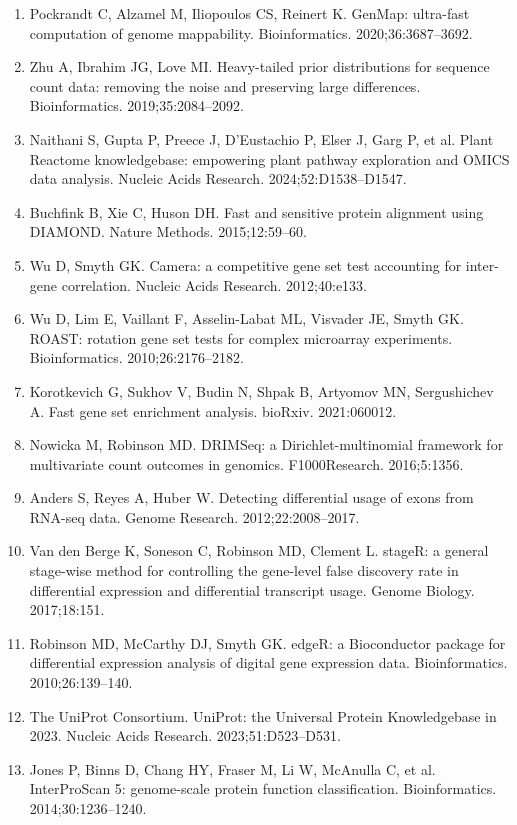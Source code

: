 \documentclass[11pt]{article}
\begin{document}
\begin{enumerate}[itemsep=1pt,leftmargin=1.6em]
\item Pockrandt C, Alzamel M, Iliopoulos CS, Reinert K. GenMap: ultra-fast computation of genome mappability. Bioinformatics. 2020;36:3687--3692.
\item Zhu A, Ibrahim JG, Love MI. Heavy-tailed prior distributions for sequence count data: removing the noise and preserving large differences. Bioinformatics. 2019;35:2084--2092.
\item Naithani S, Gupta P, Preece J, D'Eustachio P, Elser J, Garg P, et al. Plant Reactome knowledgebase: empowering plant pathway exploration and OMICS data analysis. Nucleic Acids Research. 2024;52:D1538--D1547.
\item Buchfink B, Xie C, Huson DH. Fast and sensitive protein alignment using DIAMOND. Nature Methods. 2015;12:59--60.
\item Wu D, Smyth GK. Camera: a competitive gene set test accounting for inter-gene correlation. Nucleic Acids Research. 2012;40:e133.
\item Wu D, Lim E, Vaillant F, Asselin-Labat ML, Visvader JE, Smyth GK. ROAST: rotation gene set tests for complex microarray experiments. Bioinformatics. 2010;26:2176--2182.
\item Korotkevich G, Sukhov V, Budin N, Shpak B, Artyomov MN, Sergushichev A. Fast gene set enrichment analysis. bioRxiv. 2021:060012.
\item Nowicka M, Robinson MD. DRIMSeq: a Dirichlet-multinomial framework for multivariate count outcomes in genomics. F1000Research. 2016;5:1356.
\item Anders S, Reyes A, Huber W. Detecting differential usage of exons from RNA-seq data. Genome Research. 2012;22:2008--2017.
\item Van den Berge K, Soneson C, Robinson MD, Clement L. stageR: a general stage-wise method for controlling the gene-level false discovery rate in differential expression and differential transcript usage. Genome Biology. 2017;18:151.
\item Robinson MD, McCarthy DJ, Smyth GK. edgeR: a Bioconductor package for differential expression analysis of digital gene expression data. Bioinformatics. 2010;26:139--140.
\item The UniProt Consortium. UniProt: the Universal Protein Knowledgebase in 2023. Nucleic Acids Research. 2023;51:D523--D531.
\item Jones P, Binns D, Chang HY, Fraser M, Li W, McAnulla C, et al. InterProScan 5: genome-scale protein function classification. Bioinformatics. 2014;30:1236--1240.

\end{enumerate}
\end{document}
